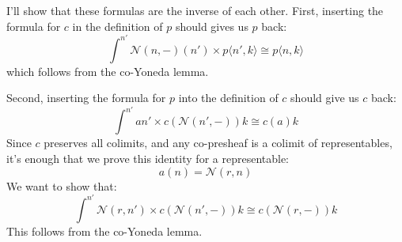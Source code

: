\documentclass[11pt]{amsart}
\newcommand{\cat}[1]{\mathcal{#1}}%
\begin{document}
I'll show that these formulas are the inverse of each other. First, inserting the formula for $c$ in the definition of $p$ should gives us $p$ back:
\[  \int^{n'} \cat N(n, -) (n') \times p\langle n', k \rangle \cong  p \langle n, k \rangle \]
which follows from the co-Yoneda lemma.

Second, inserting the formula for $p$ into the definition of $c$ should give us $c$ back:
\[  \int^{n'} a n' \times c(\cat N(n', -)) k  \cong c (a) k  \]
Since $c$ preserves all colimits, and any co-presheaf is a colimit of representables, it's enough that we prove this identity for a representable:
\[ a (n) = \cat N (r, n) \]
We want to show that:
\[ \int^{n'}  \cat N (r, n')  \times  c(\cat N(n', -)) k \cong  c ( \cat N (r, -) ) k\]
This follows from the co-Yoneda lemma.
\end{document}
